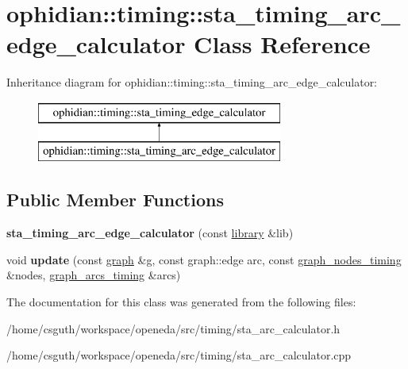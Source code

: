 \hypertarget{classophidian_1_1timing_1_1sta__timing__arc__edge__calculator}{\section{ophidian\-:\-:timing\-:\-:sta\-\_\-timing\-\_\-arc\-\_\-edge\-\_\-calculator Class Reference}
\label{classophidian_1_1timing_1_1sta__timing__arc__edge__calculator}
}
Inheritance diagram for ophidian\-:\-:timing\-:\-:sta\-\_\-timing\-\_\-arc\-\_\-edge\-\_\-calculator\-:\begin{figure}[H]
\begin{center}
\leavevmode
\includegraphics[height=2.000000cm]{classophidian_1_1timing_1_1sta__timing__arc__edge__calculator}
\end{center}
\end{figure}
\subsection*{Public Member Functions}
\begin{DoxyCompactItemize}
\item 
\hypertarget{classophidian_1_1timing_1_1sta__timing__arc__edge__calculator_aa2894632362a799075bec64cea5c0283}{{\bfseries sta\-\_\-timing\-\_\-arc\-\_\-edge\-\_\-calculator} (const \hyperlink{classophidian_1_1timing_1_1library}{library} \&lib)}\label{classophidian_1_1timing_1_1sta__timing__arc__edge__calculator_aa2894632362a799075bec64cea5c0283}

\item 
\hypertarget{classophidian_1_1timing_1_1sta__timing__arc__edge__calculator_a1d0e6c4d58f62b9c6fc7622d45b6e119}{void {\bfseries update} (const \hyperlink{classophidian_1_1timing_1_1graph}{graph} \&g, const graph\-::edge arc, const \hyperlink{classophidian_1_1timing_1_1graph__nodes__timing}{graph\-\_\-nodes\-\_\-timing} \&nodes, \hyperlink{classophidian_1_1timing_1_1graph__arcs__timing}{graph\-\_\-arcs\-\_\-timing} \&arcs)}\label{classophidian_1_1timing_1_1sta__timing__arc__edge__calculator_a1d0e6c4d58f62b9c6fc7622d45b6e119}

\end{DoxyCompactItemize}


The documentation for this class was generated from the following files\-:\begin{DoxyCompactItemize}
\item 
/home/csguth/workspace/openeda/src/timing/sta\-\_\-arc\-\_\-calculator.\-h\item 
/home/csguth/workspace/openeda/src/timing/sta\-\_\-arc\-\_\-calculator.\-cpp\end{DoxyCompactItemize}
